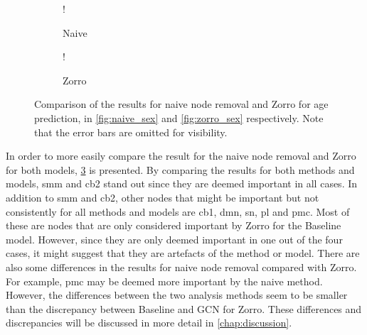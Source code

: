 
\begin{figure}[H]
    \centering
        \begin{subfigure}{.5\textwidth}
            \centering
            \begin{center}
                \resizebox {1.0\linewidth} {!} {
                    
                }
            \end{center}
            \caption{Naive}
            \label{fig:comparison_age_naive}
        \end{subfigure}%
        \begin{subfigure}{.5\textwidth}
            \centering
            \begin{center}
                \resizebox {1.0\linewidth} {!} {
                    
                }
            \end{center}
            \caption{Zorro}
            \label{fig:comparison_age_zorro}
        \end{subfigure}
    \caption{Comparison of the results for naive node removal and Zorro for age prediction, in \cref{fig:naive_sex} and \cref{fig:zorro_sex} respectively. Note that the error bars are omitted for visibility.}
    \label{fig:comparison_age}
\end{figure}

In order to more easily compare the result for the naive node removal and Zorro for both models, \cref{fig:comparison_age} is presented. By comparing the results for both methods and models, \acrshort{smm} and \acrshort{cb2} stand out since they are deemed important in all cases. In addition to \acrshort{smm} and \acrshort{cb2}, other nodes that might be important but not consistently for all methods and models are \acrshort{cb1}, \acrshort{dmn}, \acrshort{sn}, \acrshort{pl} and \acrshort{pmc}. Most of these are nodes that are only considered important by Zorro for the Baseline model. However, since they are only deemed important in one out of the four cases, it might suggest that they are artefacts of the method or model.
There are also some differences in the results for naive node removal compared with Zorro. For example, \acrshort{pmc} may be deemed more important by the naive method. However, the differences between the two analysis methods seem to be smaller than the discrepancy between Baseline and GCN for Zorro. These differences and discrepancies will be discussed in more detail in \cref{chap:discussion}.

